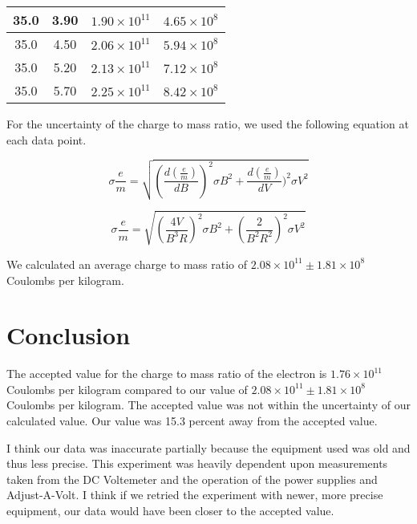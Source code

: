 \documentclass[journal, a4paper]{IEEEtran}
\begin{document}
\begin{table}[!hbt]
\begin{center}
\begin{tabular}{|c|c|c|c|}
            \hline
            35.0 & 3.90 & $1.90 \times 10^{11}$ & $4.65 \times 10^8$\\
            \hline
            35.0 & 4.50 & $2.06 \times 10^{11}$ & $5.94 \times 10^8$\\
            \hline
            35.0 & 5.20 & $2.13 \times 10^{11}$ & $7.12 \times 10^8$\\
           	\hline
            35.0 & 5.70 & $2.25 \times 10^{11}$ & $8.42 \times 10^8$\\
            \hline
		\end{tabular}
		\end{center}
	\end{table}
    
    For the uncertainty of the charge to mass ratio, we used the following equation at each data point.
    
    \begin{equation} \label{eq:emUncertainty1} %
\sigma \frac{e}{m}=\sqrt{(\frac{d(\frac{e}{m})}{dB})^2\sigma B^2+\frac{d(\frac{e}{m})}{dV})^2\sigma V^2}
\end{equation}

	\begin{equation} \label{eq:emUncertainty2} %
\sigma \frac{e}{m}= \sqrt{(\frac{4V}{B^3R})^2\sigma B^2+(\frac{2}{B^2R^2})^2\sigma V^2}
\end{equation}

	We calculated an average charge to mass ratio of $2.08 \times 10^{11} \pm 1.81 \times 10^8$ Coulombs per kilogram.


\section{Conclusion}
	The accepted value for the charge to mass ratio of the electron is $1.76 \times 10^{11}$ Coulombs per kilogram compared to our value of $2.08 \times 10^{11} \pm 1.81 \times 10^8$ Coulombs per kilogram. The accepted value was not within the uncertainty of our calculated value. Our value was 15.3 percent away from the accepted value.
    
    I think our data was inaccurate partially because the equipment used was old and thus less precise. This experiment was heavily dependent upon measurements taken from the DC Voltemeter and the operation of the power supplies and Adjust-A-Volt. I think if we retried the experiment with newer, more precise equipment, our data would have been closer to the accepted value. 
    
\end{document}
